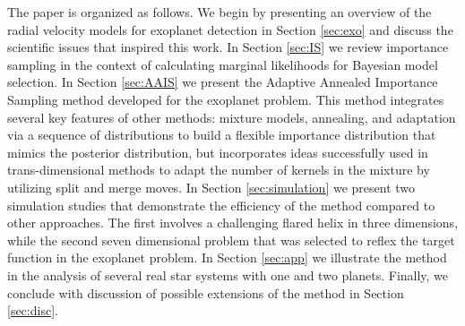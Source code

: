The paper is organized as follows.  We begin by presenting an overview
of the radial velocity models for exoplanet detection in Section
\ref{sec:exo} and discuss the scientific issues that inspired this
work. In Section \ref{sec:IS} we review importance sampling in the
context of calculating marginal likelihoods for Bayesian model
selection. In Section \ref{sec:AAIS} we present the Adaptive Annealed
Importance Sampling method developed for the exoplanet problem. This
method integrates several key features of other methods: mixture
models, annealing, and adaptation via a sequence of distributions to
build a flexible importance distribution that mimics the posterior
distribution, but incorporates ideas successfully used in
trans-dimensional methods to adapt the number of kernels in the
mixture by utilizing split and merge moves.  In Section
\ref{sec:simulation} we present two simulation studies that
demonstrate the efficiency of the method compared to other approaches.
The first involves a challenging flared helix in three dimensions,
while the second seven dimensional problem that was selected to reflex
the target function in the exoplanet problem.  In Section
\ref{sec:app} we illustrate the method in the analysis of several real
star systems with one and two planets. Finally, we conclude with
discussion of possible extensions of the method in Section
\ref{sec:disc}.
